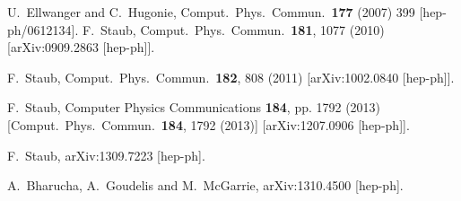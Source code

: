 \documentclass[final,3p,times]{elsarticle}
\begin{document}
\begin{thebibliography}{10}
  U.~Ellwanger and C.~Hugonie,
  Comput.\ Phys.\ Commun.\  {\bf 177} (2007) 399
  [hep-ph/0612134].
  F.~Staub,
  Comput.\ Phys.\ Commun.\  {\bf 181}, 1077 (2010)
  [arXiv:0909.2863 [hep-ph]].

  F.~Staub,
  Comput.\ Phys.\ Commun.\  {\bf 182}, 808 (2011)
  [arXiv:1002.0840 [hep-ph]].

  F.~Staub,
  Computer Physics Communications {\bf 184}, pp. 1792 (2013)
  [Comput.\ Phys.\ Commun.\  {\bf 184}, 1792 (2013)]
  [arXiv:1207.0906 [hep-ph]].

  F.~Staub,
  arXiv:1309.7223 [hep-ph].

  A.~Bharucha, A.~Goudelis and M.~McGarrie,
  arXiv:1310.4500 [hep-ph].


\end{thebibliography}
\end{document}
